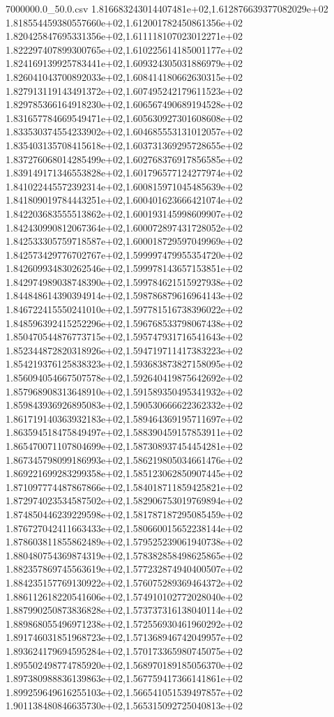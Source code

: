 \begin{filecontents*}{7000000.0_50.0.csv}
1.816683243014407481e+02,1.612876639377082029e+02
1.818554459380557660e+02,1.612001782450861356e+02
1.820425847695331356e+02,1.611118107023012271e+02
1.822297407899300765e+02,1.610225614185001177e+02
1.824169139925783441e+02,1.609324305031886979e+02
1.826041043700892033e+02,1.608414180662630315e+02
1.827913119143491372e+02,1.607495242179611523e+02
1.829785366164918230e+02,1.606567490689194528e+02
1.831657784669549471e+02,1.605630927301608608e+02
1.833530374554233902e+02,1.604685553131012057e+02
1.835403135708415618e+02,1.603731369295728655e+02
1.837276068014285499e+02,1.602768376917856585e+02
1.839149171346553828e+02,1.601796577124277974e+02
1.841022445572392314e+02,1.600815971045485639e+02
1.841809019784443251e+02,1.600401623666421074e+02
1.842203683555513862e+02,1.600193145998609907e+02
1.842430990812067364e+02,1.600072897431728052e+02
1.842533305759718587e+02,1.600018729597049969e+02
1.842573429776702767e+02,1.599997479955354720e+02
1.842609934830262546e+02,1.599978143657153851e+02
1.842974989038748390e+02,1.599784621515927938e+02
1.844848614390394914e+02,1.598786879616964143e+02
1.846722415550241010e+02,1.597781516738396022e+02
1.848596392415252296e+02,1.596768533798067438e+02
1.850470544876773715e+02,1.595747931716541643e+02
1.852344872820318926e+02,1.594719711417383223e+02
1.854219376125838323e+02,1.593683873827158095e+02
1.856094054667507578e+02,1.592640419875642692e+02
1.857968908313648910e+02,1.591589350495341932e+02
1.859843936926895083e+02,1.590530666622362332e+02
1.861719140363932183e+02,1.589464369195711697e+02
1.863594518475849497e+02,1.588390459157853911e+02
1.865470071107804699e+02,1.587308937454454281e+02
1.867345798099186993e+02,1.586219805034661476e+02
1.869221699283299358e+02,1.585123062850907445e+02
1.871097774487867866e+02,1.584018711859425821e+02
1.872974023534587502e+02,1.582906753019769894e+02
1.874850446239229598e+02,1.581787187295085459e+02
1.876727042411663433e+02,1.580660015652238144e+02
1.878603811855862489e+02,1.579525239061940738e+02
1.880480754369874319e+02,1.578382858498625865e+02
1.882357869745563619e+02,1.577232874940400507e+02
1.884235157769130922e+02,1.576075289369464372e+02
1.886112618220541606e+02,1.574910102772028040e+02
1.887990250873836828e+02,1.573737316138040114e+02
1.889868055496971238e+02,1.572556930461960292e+02
1.891746031851968723e+02,1.571368946742049957e+02
1.893624179694595284e+02,1.570173365980745075e+02
1.895502498774785920e+02,1.568970189185056370e+02
1.897380988836139863e+02,1.567759417366141861e+02
1.899259649616255103e+02,1.566541051539497857e+02
1.901138480846635730e+02,1.565315092725040813e+02

\end{filecontents*}
